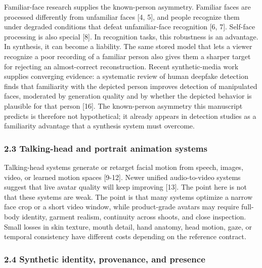 \documentclass[
]{article}
\begin{document}
Familiar-face research supplies the known-person asymmetry. Familiar
faces are processed differently from unfamiliar faces {[}4, 5{]}, and
people recognize them under degraded conditions that defeat
unfamiliar-face recognition {[}6, 7{]}. Self-face processing is also
special {[}8{]}. In recognition tasks, this robustness is an advantage.
In synthesis, it can become a liability. The same stored model that lets
a viewer recognize a poor recording of a familiar person also gives them
a sharper target for rejecting an almost-correct reconstruction. Recent
synthetic-media work supplies converging evidence: a systematic review
of human deepfake detection finds that familiarity with the depicted
person improves detection of manipulated faces, moderated by generation
quality and by whether the depicted behavior is plausible for that
person {[}16{]}. The known-person asymmetry this manuscript predicts is
therefore not hypothetical; it already appears in detection studies as a
familiarity advantage that a synthesis system must overcome.

\subsubsection{2.3 Talking-head and portrait animation
systems}\label{23-talking-head-and-portrait-animation-systems}

Talking-head systems generate or retarget facial motion from speech,
images, video, or learned motion spaces {[}9-12{]}. Newer unified
audio-to-video systems suggest that live avatar quality will keep
improving {[}13{]}. The point here is not that these systems are weak.
The point is that many systems optimize a narrow face crop or a short
video window, while product-grade avatars may require full-body
identity, garment realism, continuity across shoots, and close
inspection. Small losses in skin texture, mouth detail, hand anatomy,
head motion, gaze, or temporal consistency have different costs
depending on the reference contract.

\subsubsection{2.4 Synthetic identity, provenance, and
presence}\label{24-synthetic-identity-provenance-and-presence}
\end{document}
